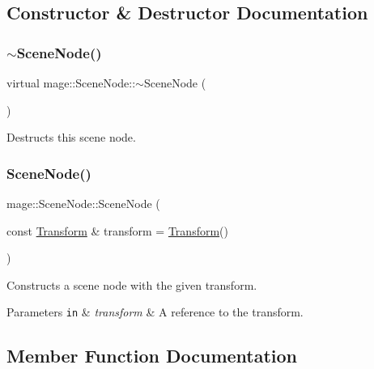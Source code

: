 \subsection{Constructor \& Destructor Documentation}
\hypertarget{classmage_1_1_scene_node_ad7ae54e25fb970772c0b0a6c5bac57ff}{}\label{classmage_1_1_scene_node_ad7ae54e25fb970772c0b0a6c5bac57ff} 
\subsubsection{\texorpdfstring{$\sim$\+Scene\+Node()}{~SceneNode()}}
{\footnotesize\ttfamily virtual mage\+::\+Scene\+Node\+::$\sim$\+Scene\+Node (\begin{DoxyParamCaption}{ }\end{DoxyParamCaption})\hspace{0.3cm}{\ttfamily [virtual]}}

Destructs this scene node. \hypertarget{classmage_1_1_scene_node_a1d6869990a42bcbd0508ae2ca1d318eb}{}\label{classmage_1_1_scene_node_a1d6869990a42bcbd0508ae2ca1d318eb} 
\subsubsection{\texorpdfstring{Scene\+Node()}{SceneNode()}}
{\footnotesize\ttfamily mage\+::\+Scene\+Node\+::\+Scene\+Node (\begin{DoxyParamCaption}\item[{const \hyperlink{structmage_1_1_transform}{Transform} \&}]{transform = {\ttfamily \hyperlink{structmage_1_1_transform}{Transform}()} }\end{DoxyParamCaption})\hspace{0.3cm}{\ttfamily [protected]}}

Constructs a scene node with the given transform.


\begin{DoxyParams}[1]{Parameters}
\mbox{\tt in}  & {\em transform} & A reference to the transform. \\
\hline
\end{DoxyParams}


\subsection{Member Function Documentation}
\hypertarget{classmage_1_1_scene_node_a32ed8763c8f8b4caa155f64551d96f13}{}\label{classmage_1_1_scene_node_a32ed8763c8f8b4caa155f64551d96f13} 
